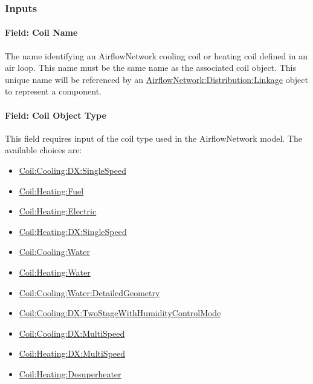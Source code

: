 \subsubsection{Inputs}\label{inputs-2016-06-16}

\paragraph{Field: Coil Name}\label{field-coil-name}

The name identifying an AirflowNetwork cooling coil or heating coil defined in an air loop. This name must be the same name as the associated coil object. This unique name will be referenced by an \hyperref[airflownetworkdistributionlinkage]{AirflowNetwork:Distribution:Linkage} object to represent a component.

\paragraph{Field: Coil Object Type}\label{field-coil-object-type}

This field requires input of the coil type used in the AirflowNetwork model. The available choices are:

\begin{itemize}
\item
  \hyperref[coilcoolingdxsinglespeed]{Coil:Cooling:DX:SingleSpeed}
\item
  \hyperref[coilheatinggas-000]{Coil:Heating:Fuel}
\item
  \hyperref[coilheatingelectric]{Coil:Heating:Electric}
\item
  \hyperref[coilheatingdxsinglespeed]{Coil:Heating:DX:SingleSpeed}
\item
  \hyperref[coilcoolingwater]{Coil:Cooling:Water}
\item
  \hyperref[coilheatingwater]{Coil:Heating:Water}
\item
  \hyperref[coilcoolingwaterdetailedgeometry]{Coil:Cooling:Water:DetailedGeometry}
\item
  \hyperref[coilcoolingdxtwostagewithhumiditycontrolmode]{Coil:Cooling:DX:TwoStageWithHumidityControlMode}
\item
  \hyperref[coilcoolingdxmultispeed]{Coil:Cooling:DX:MultiSpeed}
\item
  \hyperref[coilheatingdxmultispeed]{Coil:Heating:DX:MultiSpeed}
\item
  \hyperref[coilheatingdesuperheater]{Coil:Heating:Desuperheater}
\end{itemize}

